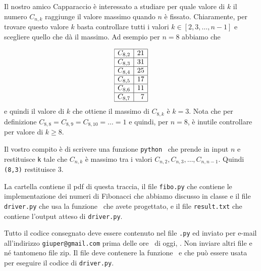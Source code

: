 \documentclass{amsart}
\begin{document}
Il nostro amico Capparaccio \`e interessato a studiare per quale valore di 
$k$ il numero $C_{n,k}$ raggiunge il valore massimo quando $n$ \`e fissato.
Chiaramente, per trovare questo valore $k$ basta controllare tutti i valori
$k\in[2,3,\ldots,n-1]$ e scegliere quello che d\`a il massimo.
Ad esempio per $n=8$ abbiamo che

$$\begin{array}{|r|r|}\hline
C_{8,2} & 21  \\ \hline
C_{8,3} & 31  \\ \hline
C_{8,4} & 25  \\ \hline
C_{8,5} & 17  \\ \hline
C_{8,6} & 11  \\ \hline
C_{8,7} & 7   \\ \hline
\end{array}$$
e quindi il valore di $k$ che ottiene il massimo di $C_{8,k}$ \`e $k=3$.
Nota che per definizione  $C_{8,8}=C_{8,9}=C_{8,10}=\ldots=1$ e quindi,
per $n=8$, \`e inutile controllare per valore di $k\geq 8$.

Il vostro compito \`e di scrivere una funzione {\tt python} \nomeMetodo\
che prende in input $n$ e restituisce {\tt k} tale che 
$C_{n,k}$ \`e massimo tra i valori $C_{n,2},C_{n,3},\ldots,C_{n,n-1}$.
Quindi {\tt\nomeMetodo(8,3)} restituisce $3$.


\medskip{}
La cartella contiene il pdf di questa traccia, il file
{\tt fibo.py} che contiene le implementazione dei numeri di Fibonacci
che abbiamo discusso in classe e 
il file {\tt driver.py} che usa la funzione \nomeMetodo\ che avete
progettato, e il file  {\tt result.txt} che contiene
l'output atteso di {\tt driver.py}.

\medskip{}
Tutto il codice consegnato deve essere contenuto nel file
{\tt \nomeClasse .py} ed inviato per e-mail all'indirizzo
{\tt giuper@gmail.com} prima delle ore \oraconsegna\ di oggi, 
\dataoggi. Non inviare altri file e n\'e tantomeno file zip.
Il file deve contenere la funzione
\nomeMetodo\ e che pu\`o essere usata per eseguire
il codice di {\tt driver.py}. 
\end{document}
